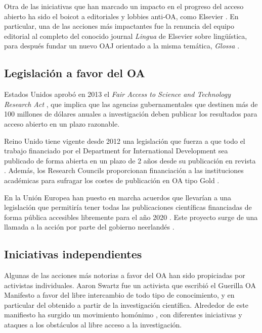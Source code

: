 \label{sec:boicot}
Otra de las iniciativas que han marcado un impacto en el progreso del acceso abierto ha sido el boicot a editoriales y lobbies anti-OA, como Elsevier \cite{costknowledge}. En particular, una de las acciones más impactantes fue la renuncia del equipo editorial al completo del conocido journal \textit{Lingua} de Elsevier sobre lingüística, para después fundar un nuevo OAJ orientado a la misma temática, \textit{Glossa} \cite{linguaglossa}.


\subsection{Legislación a favor del OA}


Estados Unidos aprobó en 2013 el \textit{Fair Access to Science and Technology Research Act} \cite{fastr}, que implica que las agencias gubernamentales que destinen más de 100 millones de dólares anuales a investigación deben publicar los resultados para acceso abierto en un plazo razonable. %

Reino Unido tiene vigente desde 2012 una legislación que fuerza a que todo el trabajo financiado por el Department for International Development sea publicado de forma abierta en un plazo de 2 años desde su publicación en revista \cite{ukdifd}. Además, los Research Councils proporcionan financiación a las instituciones académicas para sufragar los costes de publicación en OA tipo Gold \cite{rcuk}.

En la Unión Europea han puesto en marcha acuerdos que llevarían a una legislación que permitiría tener todas las publicaciones científicas financiadas de forma pública accesibles libremente para el año 2020 \cite{enserink2016dramatic}. Este proyecto surge de una llamada a la acción por parte del gobierno neerlandés \cite{amsterdam}.

\subsection{Iniciativas independientes}

Algunas de las acciones más notorias a favor del OA han sido propiciadas por activistas individuales. Aaron Swartz fue un activista que escribió el Guerilla OA Manifesto \cite{goam} a favor del libre intercambio de todo tipo de conocimiento, y en particular del obtenido a partir de la investigación científica. Alrededor de este manifiesto ha surgido un movimiento homónimo \cite{pirates}, con diferentes iniciativas y ataques a los obstáculos al libre acceso a la investigación.

